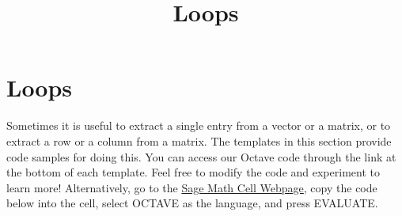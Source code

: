 \documentclass{ximera}
\title{Loops} \license{CC BY-NC-SA 4.0}
\begin{document}
\begin{abstract}
\end{abstract}
\maketitle
\section*{Loops}

Sometimes it is useful to extract a single entry from a vector or a matrix, or to extract a row or a column from a matrix.  The templates in this section provide code samples for doing this. You can access our Octave code through the link at the bottom of each template.  Feel free to modify the code and experiment to learn more!  Alternatively, go to the \href{https://sagecell.sagemath.org/}{Sage Math Cell Webpage}, copy the code below into the cell, select OCTAVE as the language, and press EVALUATE.  
\end{document}
